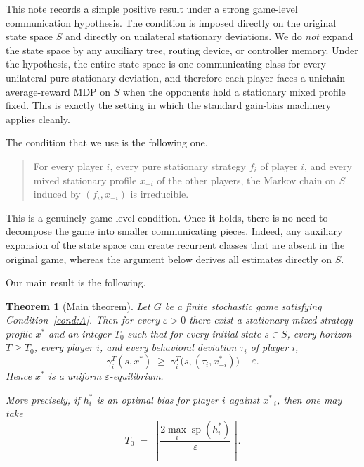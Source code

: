 \documentclass[11pt]{article}
\newtheorem{theorem}{Theorem}[section]
\theoremstyle{definition}
\newcommand{\1}{\mathbf{1}}
\DeclareMathOperator{\spn}{sp}
\begin{document}
This note records a simple positive result under a strong game-level communication hypothesis. The condition is imposed directly on the original state space $S$ and directly on unilateral stationary deviations. We do \emph{not} expand the state space by any auxiliary tree, routing device, or controller memory. Under the hypothesis, the entire state space is one communicating class for every unilateral pure stationary deviation, and therefore each player faces a unichain average-reward MDP on $S$ when the opponents hold a stationary mixed profile fixed. This is exactly the setting in which the standard gain-bias machinery applies cleanly.

The condition that we use is the following one.

\begin{quote}
For every player $i$, every pure stationary strategy $f_i$ of player $i$, and every mixed stationary profile $x_{-i}$ of the other players, the Markov chain on $S$ induced by $(f_i,x_{-i})$ is irreducible.
\end{quote}

This is a genuinely game-level condition. Once it holds, there is no need to decompose the game into smaller communicating pieces. Indeed, any auxiliary expansion of the state space can create recurrent classes that are absent in the original game, whereas the argument below derives all estimates directly on $S$.

Our main result is the following.

\begin{theorem}[Main theorem]\label{thm:intro-main}
Let $G$ be a finite stochastic game satisfying Condition~\ref{cond:A}. Then for every $\varepsilon>0$ there exist a stationary mixed strategy profile $x^*$ and an integer $T_0$ such that for every initial state $s\in S$, every horizon $T\ge T_0$, every player $i$, and every behavioral deviation $\tau_i$ of player $i$,
\[
\gamma_i^T(s,x^*)\;\ge\;\gamma_i^T\bigl(s,(\tau_i,x^*_{-i})\bigr)-\varepsilon.
\]
Hence $x^*$ is a uniform $\varepsilon$-equilibrium.

More precisely, if $h_i^*$ is an optimal bias for player $i$ against $x^*_{-i}$, then one may take
\[
T_0\;=\;\left\lceil \frac{2\max_{i}\spn(h_i^*)}{\varepsilon}\right\rceil.
\]
\end{theorem}
\end{document}
